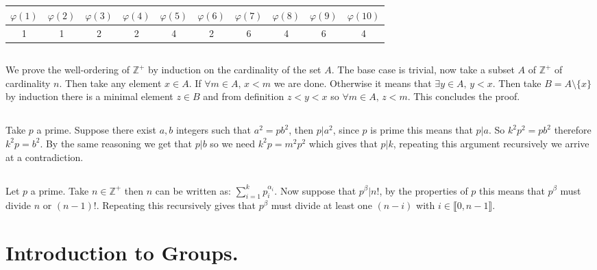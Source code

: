 \documentclass[10pt,a4paper]{book}
\begin{document}
\section{}
\begin{center}
\begin{tabular}{| c | c | c | c | c | c | c | c | c | c |}
\hline
$\varphi(1)$ & $\varphi(2)$ & $\varphi(3)$ & $\varphi(4)$ & $\varphi(5)$ & $\varphi(6)$ & $\varphi(7)$ & $\varphi(8)$ & $\varphi(9)$ & $\varphi(10)$\\
\hline
1 & 1 & 2 & 2 & 4 & 2 & 6 & 4 & 6 & 4\\
\hline 
\end{tabular}
\end{center}

\section{}
We prove the well-ordering of $\mathbb{Z}^+$ by induction on the cardinality of the set $A$. The base case is trivial, now take a subset $A$ of $\mathbb{Z}^+$ of cardinality $n$. Then take any element $x \in A$. If $\forall m \in A,\,x < m$ we are done. Otherwise it means that $\exists y \in A,\, y < x$. Then take $B = A \setminus \{x\}$ by induction there is a minimal element $z \in B$ and from definition $z < y < x$ so $\forall m \in A,\, z < m$. This concludes the proof.

\section{}
Take $p$ a prime. Suppose there exist $a, b$ integers such that $a^2 = p b^2$, then $p | a^2$, since $p$ is prime this means that $p | a$. So $k^2 p^2 = p b^2$ therefore $ k^2 p = b^2$. By the same reasoning we get that $p | b$ so we need $k^2 p = m^2 p^2$ which gives that $p | k$, repeating this argument recursively we arrive at a contradiction.

\section{}
Let $p$ a prime. Take $n \in \mathbb{Z}^+$ then $n$ can be written as: $\sum_{i = 1}^k p_i^{\alpha_i}$. Now suppose that $p^\beta | n!$, by the properties of $p$ this means that $p^\beta$ must divide $n$ or $(n-1)!$. Repeating this recursively gives that $p^\beta$ must divide at least one $(n - i)$ with $i \in \llbracket 0, n-1 \rrbracket$.

\chapter{Introduction to Groups.}
\end{document}
